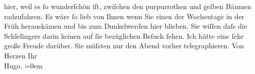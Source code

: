 \begin{ledgroupsized}[t]{13cm}
                    hier, weil es ſo wunderſchön iſt, zwiſchen {\pb}den purpurrothen und gelben
                    Bäumen radzufahren. Es wäre ſo lieb von Ihnen wenn Sie einen der Wochentage in
                    der Früh herauskämen und bis zum Dunkelwerden hier blieben. Sie wiſſen daſs die
                        Schleſingers darin keinen auf
                    ſie bezüglichen Beſuch {\pb}ſehen. Ich hätte eine ſehr große Freude darüber. Sie müſsten nur den Abend
                    vorher telegraphieren.\pend
           \pstart
           Von Herzen Ihr{\\[\baselineskip]}\spacefill\mbox{Hugo.}\pend
           \leftskip=0em{}
         
         \endnumbering{}\end{ledgroupsized}  \newcommand{\dateiname}{L00851}\newcommand{\titel}{Hugo von Hofmannsthal an Arthur Schnitzler, 12. 10. [1898]}\newcommand{\editorInnen}{Martin Anton Müller und Gerd-Hermann Susen}
      